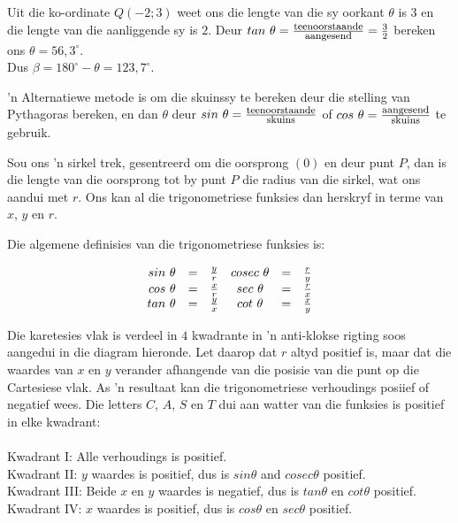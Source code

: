 Uit die ko-ordinate $Q(-2;3)$ weet ons die lengte van die sy oorkant $\theta$ is $3$ en die lengte van die aanliggende sy is $2$. Deur $tan~\theta=\frac{\mbox{\footnotesize teenoorstaande}}{\mbox{\footnotesize aangesend}} = \frac{3}{2}$ bereken ons $\theta=56,3^{\circ}$.
\\Dus $\beta=180^{\circ} - \theta = 123,7^{\circ}$.\par

'n Alternatiewe metode is om die skuinssy te bereken deur die stelling van Pythagoras bereken, en dan $\theta$ deur $sin~\theta = \frac{\mbox{\footnotesize teenoorstaande}}{\mbox{\footnotesize skuins}}$ of $cos~\theta = \frac{\mbox{\footnotesize aangesend}}{\mbox{\footnotesize skuins}}$ te gebruik. \par
Sou ons 'n sirkel trek, gesentreerd om die oorsprong $(0)$ en deur punt $P$, dan is die lengte van die oorsprong tot by punt $P$ die radius van die sirkel, wat ons aandui met $r$. Ons kan al die trigonometriese funksies dan herskryf in terme van $x$, $y$ en $r$.

Die algemene definisies van die trigonometriese funksies is:

\begin{equation*}
\begin{array}{cccccc}\hfill sin~\theta & =& \frac{y}{r}\hfill & cosec~\theta & =& \frac{r}{y}\hfill \\
 \hfill cos~\theta & =& \frac{x}{r}\hfill & sec~\theta & =& \frac{r}{x}\hfill \\
 \hfill tan~\theta & =& \frac{y}{x}\hfill & cot~\theta & =& \frac{x}{y}\hfill \end{array}
\end{equation*}

Die karetesies vlak is verdeel in $4$ kwadrante in 'n anti-klokse rigting soos aangedui in die diagram hieronde. Let daarop dat $r$ altyd positief is, maar dat die waardes van $x$ en $y$ verander afhangende van die posisie van die punt op die Cartesiese vlak. As 'n resultaat kan die trigonometriese 
verhoudings posiief of negatief wees. Die letters $C$, $A$, $S$ en $T$ dui aan watter van die funksies is positief in elke kwadrant:\\
\\
Kwadrant I: Alle verhoudings is positief.\\
Kwadrant II: $y$ waardes is positief, dus is $sin\theta$ and $cosec\theta$ positief.\\
Kwadrant III: Beide $x$ en $y$ waardes is negatief, dus is $tan\theta$ en $cot\theta$ positief. \\
Kwadrant IV: $x$ waardes is positief, dus is $cos\theta$ en $sec\theta$ positief.\par


